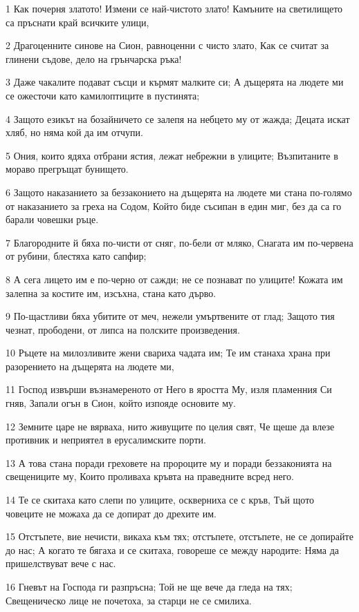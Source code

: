 \par 1 Как почерня златото! Измени се най-чистото злато! Камъните на светилището са пръснати край всичките улици,
\par 2 Драгоценните синове на Сион, равноценни с чисто злато, Как се считат за глинени съдове, дело на грънчарска ръка!
\par 3 Даже чакалите подават съсци и кърмят малките си; А дъщерята на людете ми се ожесточи като камилоптиците в пустинята;
\par 4 Защото езикът на бозайничето се залепя на небцето му от жажда; Децата искат хляб, но няма кой да им отчупи.
\par 5 Ония, които ядяха отбрани ястия, лежат небрежни в улиците; Възпитаните в мораво прегръщат бунището.
\par 6 Защото наказанието за беззаконието на дъщерята на людете ми стана по-голямо от наказанието за греха на Содом, Който биде съсипан в един миг, без да са го барали човешки ръце.
\par 7 Благородните й бяха по-чисти от сняг, по-бели от мляко, Снагата им по-червена от рубини, блестяха като сапфир;
\par 8 А сега лицето им е по-черно от сажди; не се познават по улиците! Кожата им залепна за костите им, изсъхна, стана като дърво.
\par 9 По-щастливи бяха убитите от меч, нежели умъртвените от глад; Защото тия чезнат, прободени, от липса на полските произведения.
\par 10 Ръцете на милозливите жени свариха чадата им; Те им станаха храна при разорението на дъщерята на людете ми,
\par 11 Господ извърши възнамереното от Него в яростта Му, изля пламенния Си гняв, Запали огън в Сион, който изпояде основите му.
\par 12 Земните царе не вярваха, нито живущите по целия свят, Че щеше да влезе противник и неприятел в ерусалимските порти.
\par 13 А това стана поради греховете на пророците му и поради беззаконията на свещениците му, Които проливаха кръвта на праведните всред него.
\par 14 Те се скитаха като слепи по улиците, оскверниха се с кръв, Тъй щото човеците не можаха да се допират до дрехите им.
\par 15 Отстъпете, вие нечисти, викаха към тях; отстъпете, отстъпете, не се допирайте до нас; А когато те бягаха и се скитаха, говореше се между народите: Няма да пришелствуват вече с нас.
\par 16 Гневът на Господа ги разпръсна; Той не ще вече да гледа на тях; Свещеническо лице не почетоха, за старци не се смилиха.
